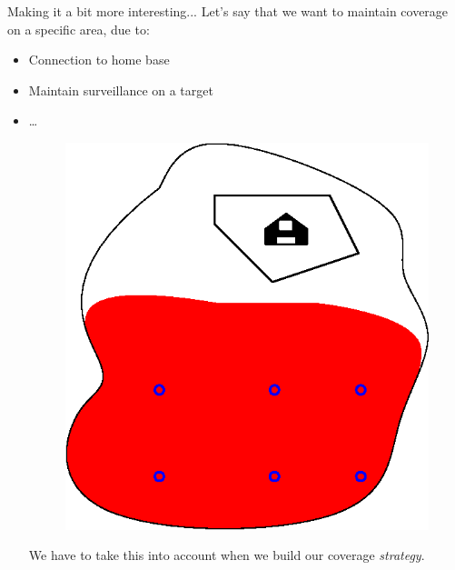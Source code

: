 \documentclass[t]{beamer}
\begin{document}
\begin{frame}[label=motivation9]{Making it a bit more interesting...}
Let's say that we want to maintain coverage on a specific area, due to:
\begin{itemize}
\item Connection to home base
\item Maintain surveillance on a target
\item \ldots
\begin{figure}[b]
\includegraphics[scale=0.4]{motivation/deployment-configuration-coverage-constraint.eps}
\end{figure}
We have to take this into account when we build our coverage \emph{strategy}.
\end{itemize}
\end{frame}
\end{document}
